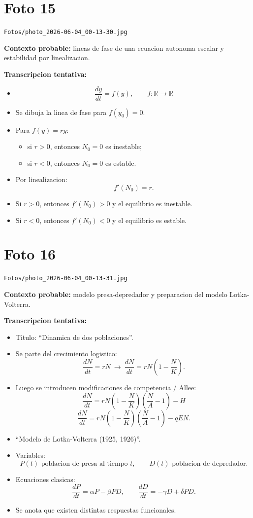 \documentclass[11pt,letterpaper]{article}
\begin{document}
\section*{Foto 15}
\texttt{Fotos/photo\_2026-06-04\_00-13-30.jpg}

\textbf{Contexto probable:} lineas de fase de una ecuacion autonoma escalar y estabilidad por linealizacion.

\textbf{Transcripcion tentativa:}
\begin{itemize}[leftmargin=*]
    \item \[
    \frac{dy}{dt}=f(y), \qquad f:\mathbb{R}\to\mathbb{R}
    \]
    \item Se dibuja la linea de fase para \(f(y_0)=0\).
    \item Para \(f(y)=ry\):
    \begin{itemize}
        \item si \(r>0\), entonces \(N_0=0\) es inestable;
        \item si \(r<0\), entonces \(N_0=0\) es estable.
    \end{itemize}
    \item Por linealizacion:
    \[
    f'(N_0)=r.
    \]
    \item Si \(r>0\), entonces \(f'(N_0)>0\) y el equilibrio es inestable.
    \item Si \(r<0\), entonces \(f'(N_0)<0\) y el equilibrio es estable.
\end{itemize}

\section*{Foto 16}
\texttt{Fotos/photo\_2026-06-04\_00-13-31.jpg}

\textbf{Contexto probable:} modelo presa-depredador y preparacion del modelo Lotka-Volterra.

\textbf{Transcripcion tentativa:}
\begin{itemize}[leftmargin=*]
    \item Titulo: ``Dinamica de dos poblaciones''.
    \item Se parte del crecimiento logistico:
    \[
    \frac{dN}{dt}=rN \ \longrightarrow\ \frac{dN}{dt}=rN\left(1-\frac{N}{K}\right).
    \]
    \item Luego se introducen modificaciones de competencia / Allee:
    \[
    \frac{dN}{dt}=rN\left(1-\frac{N}{K}\right)\left(\frac{N}{A}-1\right)-H
    \]
    \[
    \frac{dN}{dt}=rN\left(1-\frac{N}{K}\right)\left(\frac{N}{A}-1\right)-qEN.
    \]
    \item ``Modelo de Lotka-Volterra (1925, 1926)''.
    \item Variables:
    \[
    P(t) \text{ poblacion de presa al tiempo } t,
    \qquad
    D(t) \text{ poblacion de depredador}.
    \]
    \item Ecuaciones clasicas:
    \[
    \frac{dP}{dt}=\alpha P-\beta PD,
    \qquad
    \frac{dD}{dt}=-\gamma D+\delta PD.
    \]
    \item Se anota que existen distintas respuestas funcionales.
\end{itemize}
\end{document}
